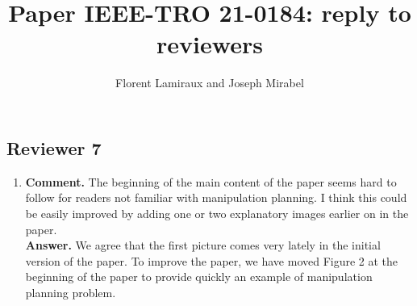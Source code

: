 \documentclass{article}
\title{Paper IEEE-TRO 21-0184: reply to reviewers}
\author{Florent Lamiraux and Joseph Mirabel}
\date{}
\begin{document}
\maketitle
\subsection*{Reviewer 7}
\begin{enumerate}
  \item \textbf{Comment.} The beginning of the main content of the
    paper seems hard to follow for readers not familiar with
    manipulation planning.  I think this could be easily improved by
    adding one or two explanatory images earlier on in the
    paper.\\
    \textbf{Answer.} We agree that the first picture comes very lately in the
    initial version of the paper. To improve the paper, we have moved Figure 2
    at the beginning of the paper to provide quickly an example of manipulation
    planning problem.
\end{enumerate}
\end{document}
